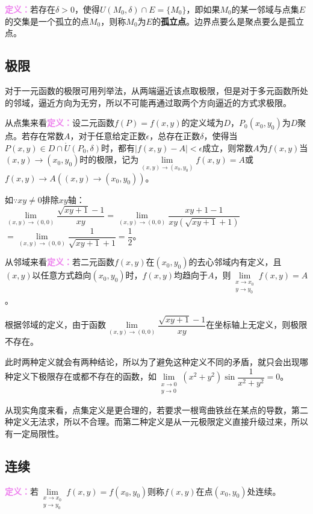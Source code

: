 \documentclass[UTF8, 12pt]{ctexart}
\begin{document}
\textcolor{violet}{\textbf{定义：}}若存在$\delta>0$，使得$U(M_0,\delta)\cap E=\{M_0\}$，即如果$M_0$的某一邻域与点集$E$的交集是一个孤立的点$M_0$，则称$M_0$为$E$的\textbf{孤立点}。边界点要么是聚点要么是孤立点。

\subsection{极限}

对于一元函数的极限可用列举法，从两端逼近该点取极限，但是对于多元函数所处的邻域，逼近方向为无穷，所以不可能再通过取两个方向逼近的方式求极限。

从点集来看\textcolor{violet}{\textbf{定义：}}设二元函数$f(P)=f(x,y)$的定义域为$D$，$P_0(x_0,y_0)$为$D$聚点。若存在常数$A$，对于任意给定正数$\epsilon$，总存在正数$\delta$，使得当$P(x,y)\in D\cap\mathring{U}(P_0,\delta)$时，都有$\vert f(x,y)-A\vert<\epsilon$成立，则常数$A$为$f(x,y)$当$(x,y)\rightarrow(x_0,y_0)$时的极限，记为$\lim\limits_{(x,y)\to(x_0,y_0)}f(x,y)=A$或$f(x,y)\to A((x,y)\to(x_0,y_0))$。

如$\because xy\neq0$排除$xy$轴：$\lim\limits_{(x,y)\to(0,0)}\dfrac{\sqrt{xy+1}-1}{xy}=\lim\limits_{(x,y)\to(0,0)}\dfrac{xy+1-1}{xy(\sqrt{xy+1}+1)}$\\$=\lim\limits_{(x,y)\to(0,0)}\dfrac{1}{\sqrt{xy+1}+1}=\dfrac{1}{2}$。\medskip

从邻域来看\textcolor{violet}{\textbf{定义：}}若二元函数$f(x,y)$在$(x_0,y_0)$的去心邻域内有定义，且$(x,y)$以任意方式趋向$(x_0,y_0)$时，$f(x,y)$均趋向于$A$，则$\lim\limits_{\substack{x\to x_0\\y\to y_0}}f(x,y)=A$。

根据邻域的定义，由于函数$\lim\limits_{(x,y)\to(0,0)}\dfrac{\sqrt{xy+1}-1}{xy}$在坐标轴上无定义，则极限不存在。

此时两种定义就会有两种结论，所以为了避免这种定义不同的矛盾，就只会出现哪种定义下极限存在或都不存在的函数，如$\lim\limits_{\substack{x\to0\\y\to0}}(x^2+y^2)\sin\dfrac{1}{x^2+y^2}=0$。

从现实角度来看，点集定义是更合理的，若要求一根弯曲铁丝在某点的导数，第二种定义无法求，所以不合理。而第二种定义是从一元极限定义直接升级过来，所以有一定局限性。

\subsection{连续}

\textcolor{violet}{\textbf{定义：}}若$\lim\limits_{\substack{x\to x_0\\y\to y_0}}f(x,y)=f(x_0,y_0)$则称$f(x,y)$在点$(x_0,y_0)$处连续。
\end{document}
